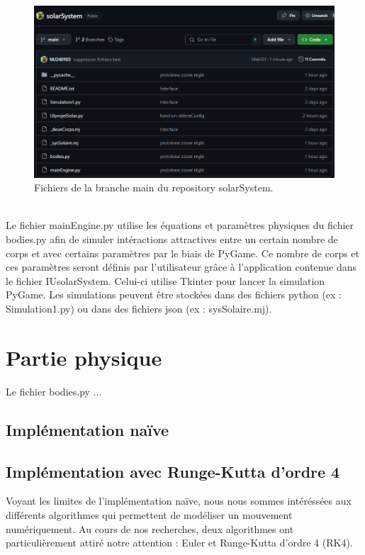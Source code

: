 \documentclass{article}
\begin{document}
    \\

    \begin{figure}[h]
        \centering
        \includegraphics[width=0.5\linewidth]{imgGitHub.png}
        \caption{\label{fig:Git}Fichiers de la branche main du repository solarSystem.}
    \end{figure}

    \\

    Le fichier mainEngine.py utilise les équations et paramètres physiques du fichier bodies.py afin de simuler intéractions attractives entre un certain nombre de corps et avec certains paramètres par le biais de PyGame. Ce nombre de corps et ces paramètres seront définis par l'utilisateur grâce à l'application contenue dans le fichier IUsolarSystem. Celui-ci utilise Tkinter pour lancer la simulation PyGame. Les simulations peuvent être stockées dans des fichiers python (ex : Simulation1.py) ou dans des fichiers json (ex : sysSolaire.mj).

\section{Partie physique}

    Le fichier bodies.py ...
    
    \subsection{Implémentation naïve}

    \subsection{Implémentation avec Runge-Kutta d'ordre 4}

        Voyant les limites de l'implémentation naïve, nous nous sommes intéréssées aux différents algorithmes qui permettent de modéliser un mouvement numériquement. Au cours de nos recherches, deux algorithmes ont particulièrement attiré notre attention : Euler et Runge-Kutta d'ordre 4 (RK4).
\end{document}
